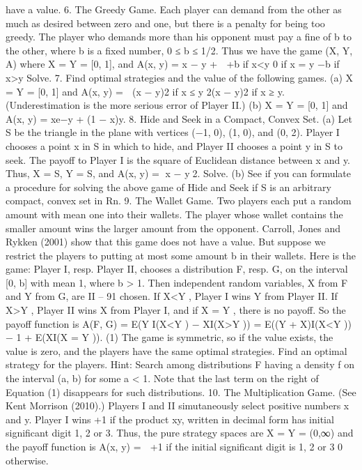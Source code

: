 \documentclass[]{report}
\begin{document}
have a value.
6. The Greedy Game. Each player can demand from the other as much as desired
between zero and one, but there is a penalty for being too greedy. The player who demands
more than his opponent must pay a fine of b to the other, where b is a fixed number,
0 ≤ b ≤ 1/2. Thus we have the game (X, Y, A) where X = Y = [0, 1], and
A(x, y) = x − y +
 +b if x<y
0 if x = y
−b if x>y
Solve.
7. Find optimal strategies and the value of the following games.
(a) X = Y = [0, 1] and A(x, y) =  (x − y)2 if x ≤ y
2(x − y)2 if x ≥ y. (Underestimation is the more
serious error of Player II.)
(b) X = Y = [0, 1] and A(x, y) = xe−y + (1 − x)y.
8. Hide and Seek in a Compact, Convex Set. (a) Let S be the triangle in the
plane with vertices (−1, 0), (1, 0), and (0, 2). Player I chooses a point x in S in which to
hide, and Player II chooses a point y in S to seek. The payoff to Player I is the square
of Euclidean distance between x and y. Thus, X = S, Y = S, and A(x, y) = x − y2.
Solve.
(b) See if you can formulate a procedure for solving the above game of Hide and Seek
if S is an arbitrary compact, convex set in Rn.
9. The Wallet Game. Two players each put a random amount with mean one into
their wallets. The player whose wallet contains the smaller amount wins the larger amount
from the opponent.
Carroll, Jones and Rykken (2001) show that this game does not have a value. But
suppose we restrict the players to putting at most some amount b in their wallets. Here is
the game:
Player I, resp. Player II, chooses a distribution F, resp. G, on the interval [0, b] with
mean 1, where b > 1. Then independent random variables, X from F and Y from G, are
II – 91
chosen. If X<Y , Player I wins Y from Player II. If X>Y , Player II wins X from Player
I, and if X = Y , there is no payoff. So the payoff function is
A(F, G) = E(Y I(X<Y ) − XI(X>Y ))
= E((Y + X)I(X<Y )) − 1 + E(XI(X = Y )). (1)
The game is symmetric, so if the value exists, the value is zero, and the players have the
same optimal strategies. Find an optimal strategy for the players. Hint: Search among
distributions F having a density f on the interval (a, b) for some a < 1. Note that the last
term on the right of Equation (1) disappears for such distributions.
10. The Multiplication Game. (See Kent Morrison (2010).) Players I and II
simutaneously select positive numbers x and y. Player I wins +1 if the product xy, written
in decimal form has initial significant digit 1, 2 or 3. Thus, the pure strategy spaces are
X = Y = (0,∞) and the payoff function is
A(x, y) =  +1 if the initial significant digit is 1, 2 or 3
0 otherwise.
\end{document}
